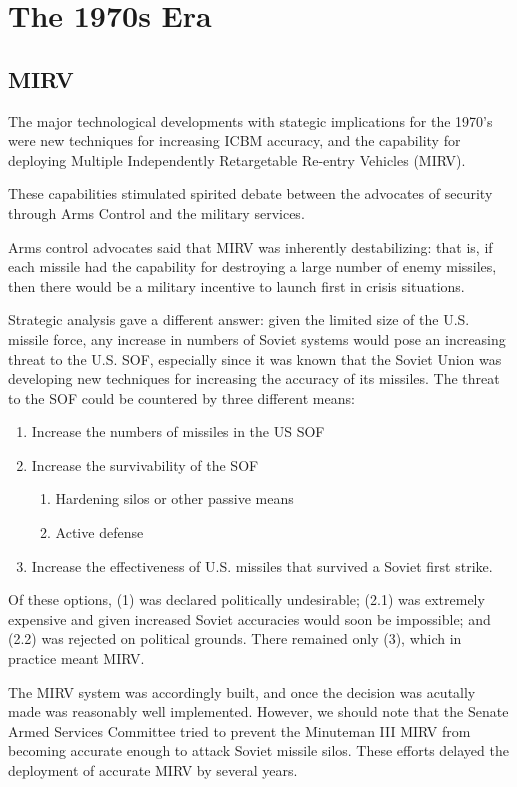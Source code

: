 \section{The 1970s Era}
\subsection{MIRV}
The major technological developments with stategic implications for the 1970's were new techniques for increasing ICBM accuracy, and the capability for deploying Multiple Independently Retargetable Re-entry Vehicles (MIRV).

These capabilities stimulated spirited debate between the advocates of security through Arms Control and the military services.

Arms control advocates said that MIRV was inherently destabilizing: that is, if each missile had the capability for destroying a large number of enemy missiles, then there would be a military incentive to launch first in crisis situations.

Strategic analysis gave a different answer: given the limited size of the U.S. missile force, any increase in numbers of Soviet systems would pose an increasing threat to the U.S. SOF, especially since it was known that the Soviet Union was developing new techniques for increasing the accuracy of its missiles. The threat to the SOF could be countered by three different means:

\begin{enumerate}[label*=\arabic*.]
    \item Increase the numbers of missiles in the US SOF
    \item Increase the survivability of the SOF
    \begin{enumerate}[label*=\arabic*.]
        \item Hardening silos or other passive means
        \item Active defense
    \end{enumerate}
    \item Increase the effectiveness of U.S. missiles that survived a Soviet first strike.
\end{enumerate}

Of these options, (1) was declared politically undesirable; (2.1) was extremely expensive and given increased Soviet accuracies would soon be impossible; and (2.2) was rejected on political grounds. There remained only (3), which in practice meant MIRV.

The MIRV system was accordingly built, and once the decision was acutally made was reasonably well implemented. However, we should note that the Senate Armed Services Committee tried to prevent the Minuteman III MIRV from becoming accurate enough to attack Soviet missile silos. These efforts delayed the deployment of accurate MIRV by several years.

